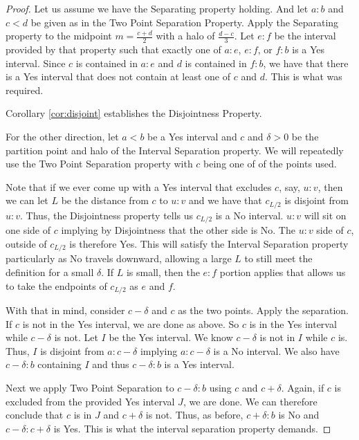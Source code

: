 \documentclass[12pt]{article}
\begin{document}
\begin{proof}
    Let us assume we have the Separating property holding. And let $a:b$ and $c < d$ be given as in the Two Point Separation Property. Apply the Separating property to the midpoint $m =\frac{c+d}{2}$ with a halo of $\frac{d-c}{3}$. Let $e:f$ be the interval provided by that property such that exactly one of $a:e$, $e:f$, or $f:b$ is a Yes interval. Since $c$ is contained in $a:e$ and $d$ is contained in $f:b$, we have that there is a Yes interval that does not contain at least one of $c$ and $d$. This is what was required. 
    
    Corollary \ref{cor:disjoint} establishes the Disjointness Property. 

    For the other direction, let $a < b$ be a Yes interval and $c$ and $\delta >0$ be the partition point and halo of the Interval Separation property. We will repeatedly use the Two Point Separation property with $c$ being one of of the points used. 
    
    Note that if we ever come up with a Yes interval that excludes $c$, say, $u:v$, then we can let $L$ be the distance from $c$ to $u:v$ and we have that $c_{L/2}$ is disjoint from $u:v$. Thus, the Disjointness property tells us $c_{L/2}$ is a No interval. $u:v$ will sit on one side of $c$ implying by Disjointness that the other side is No. The $u:v$ side of $c$, outside of $c_{L/2}$ is therefore Yes. This will satisfy the Interval Separation property particularly as No travels downward, allowing a large $L$ to still meet the definition for a small $\delta$. If $L$ is small, then the $e:f$ portion applies that allows us to take the endpoints of $c_{L/2}$ as $e$ and $f$.
    
    With that in mind, consider $c-\delta$ and $c$ as the two points. Apply the separation. If $c$ is not in the Yes interval, we are done as above. So $c$ is in the Yes interval while $c-\delta$ is not. Let $I$ be the Yes interval. We know $c-\delta$ is not in $I$ while $c$ is. Thus, $I$ is disjoint from $a:c-\delta$ implying $a:c-\delta$ is a No interval. We also have $c-\delta:b$ containing $I$ and thus $c-\delta:b$ is a Yes interval. 

    Next we apply Two Point Separation to $c-\delta:b$ using $c$ and $c+\delta$. Again, if $c$ is excluded from the provided Yes interval $J$, we are done. We can therefore conclude that $c$ is in $J$ and $c+\delta$ is not. Thus, as before, $c+\delta:b$ is No
    and $c-\delta:c+\delta$ is Yes. This is what the interval separation property demands. 
    
\end{proof}
\end{document}
